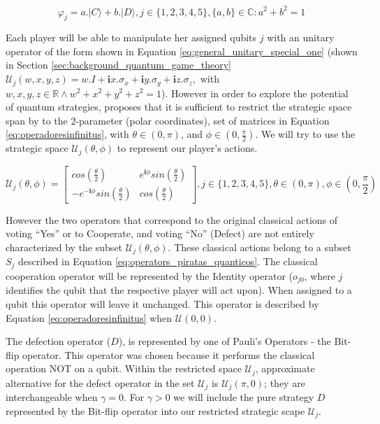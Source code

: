 \begin{equation}
\varphi_{j} = a . \vert C \rangle + b . \vert D \rangle , j \in \{ 1, 2, 3, 4, 5 \}, \{ a,b \} \in \mathbb{C} : a^2 + b^2 =1
\label{eq:opvarphiquantumstates}
\end{equation}

Each player will be able to manipulate her assigned qubits $j$ with an unitary operator of the form shown in Equation \ref{eq:general_unitary_special_one} (shown in Section \ref{sec:background_quantum_game_theory} $\mathcal{U}_{j}(w,x,y,z)=w.I + \mathbf{i}x.\sigma_{x} + \mathbf{i}y.\sigma_{y} + \mathbf{i}z.\sigma_{z}, $ with $ w,x,y,z \in \mathbb{R} \wedge  
w^2 + x^2 + y^2 + z^2 =1 $). However in  order to explore the potential of quantum strategies, \cite{Eisert2008} proposes that it is sufficient to restrict the strategic space span by to the $2$-parameter (polar coordinates), set of matrices in Equation \ref{eq:operadoresinfinitus}, with $ \theta \in ( 0, \pi )$, and $\phi \in ( 0, \frac{\pi}{2})$. We will try to use the strategic space $\mathcal{U}_{j}(\theta,\phi)$ to represent our player's actions.



\begin{equation}
\mathcal{U}_{j}(\theta,\phi) = \left[\begin{array}{cc}
cos(\frac{\theta}{2}) & e^{\mathbf{i}\phi}sin(\frac{\theta}{2})\\
-e^{-\mathbf{i}\phi}sin(\frac{\theta}{2}) & cos(\frac{\theta}{2})
\end{array}\right] , j \in \{ 1, 2, 3, 4, 5 \}, \theta \in ( 0, \pi ) , \phi \in ( 0, \frac{\pi}{2})
\label{eq:operadoresinfinitus}
\end{equation}


 However the two operators that correspond to the original classical actions of voting ``Yes'' or to Cooperate, and voting ``No'' (Defect) are not entirely characterized by the subset $\mathcal{U}_{j}(\theta, \phi)$. These classical actions belong to a subset $S_{j}$ described in Equation \ref{eq:operators_piratas_quanticos}.  
The classical cooperation operator will be represented by the Identity operator ($o_{j0}$, where $j$ identifies the qubit that the respective player will act upon). When assigned to a qubit this operator will leave it unchanged. This operator is described by Equation \ref{eq:operadoresinfinitus} when $\mathcal{U}(0,0)$.

The defection operator ($D$), is represented by one of Pauli's Operators - the Bit-flip operator. This operator was chosen because it performs the classical operation NOT on a qubit. 
Within the restricted space $\mathcal{U}_{j}$, approximate alternative for the defect operator in the set $\mathcal{U}_{j}$ is $\mathcal{U}_{j}(\pi, 0)$; they are interchangeable when $\gamma = 0$. For $\gamma >0$ we will include the pure strategy $D$ represented by the Bit-flip operator into our restricted strategic scape $\mathcal{U}_{j}$.



